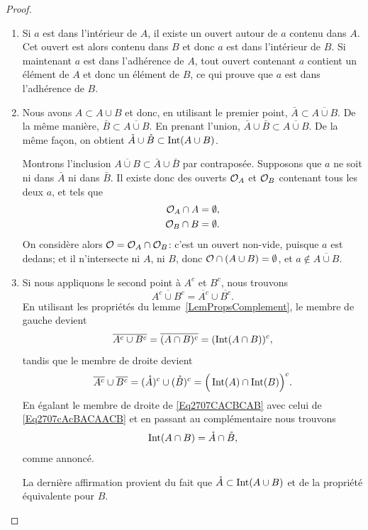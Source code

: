 \begin{proof}
	\begin{enumerate}
		\item
                  Si $a$ est dans l'intérieur de $A$, il existe un ouvert autour de $a$ contenu dans $A$. Cet ouvert est alors contenu dans $B$ et donc $a$ est dans l'intérieur de $B$. Si maintenant $a$ est dans l'adhérence de $A$, tout ouvert contenant $a$ contient un élément de $A$ et donc un élément de $B$, ce qui prouve que $a$ est dans l'adhérence de $B$.
		\item
                  Nous avons $A\subset A\cup B$ et donc, en utilisant le premier point, $\bar A\subset\overline{ A\cup B }$. De la même manière, $\bar B\subset\overline{ A\cup B }$. En prenant l'union, $\bar A\cup\bar B\subset\overline{ A\cup B }$. De la même façon, on obtient $\mathring A \cup \mathring B \subset \operatorname{Int}(A\cup B)$.

                  Montrons l'inclusion $\overline{ A\cup B }\subset \bar A\cup\bar B$ par contraposée. Supposons que $a$ ne soit ni dans $\bar A$ ni dans $\bar B$. Il existe donc des ouverts $\mathcal{O}_A$ et $\mathcal{O}_B$ contenant tous les deux $a$, et tels que
			\begin{equation}
				\begin{aligned}[]
					\mO_A\cap A&=\emptyset,\\
					\mO_B \cap B&=\emptyset.
				\end{aligned}
			\end{equation}
                        On considère alors $\mathcal{O} = \mathcal{O}_A \cap \mathcal{O}_B$: c'est un ouvert non-vide, puisque $a$ est dedans; et il n'intersecte ni $A$, ni $B$, donc $\mathcal{O} \cap (A \cup B) = \emptyset$, et $a\notin\overline{ A\cup B }$.

		\item
			Si nous appliquons le second point à $A^c$ et $B^c$, nous trouvons
			\begin{equation}
				\overline{ A^c\cup B^c }=\overline{A^c}\cup\overline{ B^c}.
			\end{equation}
			En utilisant les propriétés du lemme~\ref{LemPropsComplement}, le membre de gauche devient
			\begin{equation}	\label{Eq2707CACBCAB}
				\overline{ A^c\cup B^c }=\overline{(A\cap B)^c }=(\operatorname{Int}(A\cap B))^c,
			\end{equation}
			tandis que le membre de droite devient
			\begin{equation}		\label{Eq2707cAcBACAACB}
				\overline{ A^c }\cup\overline{ B^c }=(\mathring A)^c\cup(\mathring B)^c=\Big( \operatorname{Int}(A)\cap\operatorname{Int}(B) \Big)^c.
			\end{equation}
			En égalant le membre de droite de \eqref{Eq2707CACBCAB} avec celui de \eqref{Eq2707cAcBACAACB} et en passant au complémentaire nous trouvons
			\begin{equation}
				\operatorname{Int}(A\cap B)=\mathring A \cap\mathring B,
			\end{equation}
			comme annoncé.

			La dernière affirmation provient du fait que $\mathring A \subset \operatorname{Int}(A\cup B)$ et de la propriété équivalente pour $B$.
	\end{enumerate}
\end{proof}

